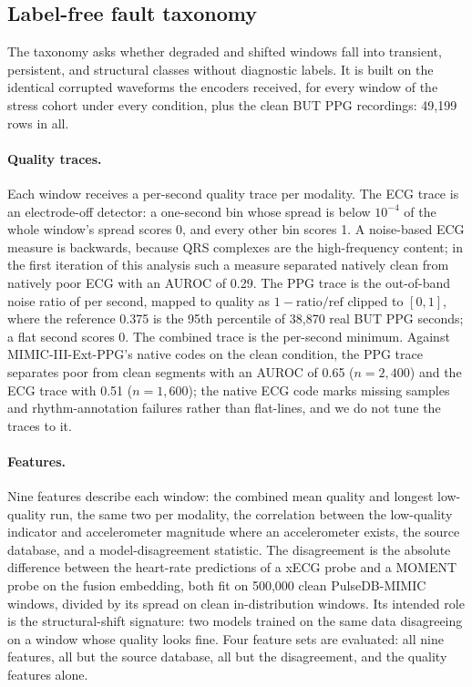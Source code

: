 \documentclass[pmlr,twocolumn,10pt]{jmlr}
\newcommand{\domainmodel}{xECG}
\newcommand{\tsmodel}{MOMENT}
\begin{document}
\subsection{Label-free fault taxonomy}
\label{sec:taxonomy}

The taxonomy asks whether degraded and shifted windows fall into transient, persistent, and structural classes without diagnostic labels. It is built on the identical corrupted waveforms the encoders received, for every window of the stress cohort under every condition, plus the clean BUT PPG recordings: 49,199 rows in all.

\paragraph{Quality traces.}
Each window receives a per-second quality trace per modality. The ECG trace is an electrode-off detector: a one-second bin whose spread is below $10^{-4}$ of the whole window's spread scores 0, and every other bin scores 1. A noise-based ECG measure is backwards, because QRS complexes are the high-frequency content; in the first iteration of this analysis such a measure separated natively clean from natively poor ECG with an AUROC of 0.29. The PPG trace is the out-of-band noise ratio of  per second, mapped to quality as $1-\text{ratio}/\text{ref}$ clipped to $[0,1]$, where the reference 0.375 is the 95th percentile of 38,870 real BUT PPG seconds; a flat second scores 0. The combined trace is the per-second minimum. Against MIMIC-III-Ext-PPG's native codes on the clean condition, the PPG trace separates poor from clean segments with an AUROC of 0.65 ($n=2{,}400$) and the ECG trace with 0.51 ($n=1{,}600$); the native ECG code marks missing samples and rhythm-annotation failures rather than flat-lines, and we do not tune the traces to it.

\paragraph{Features.}
Nine features describe each window: the combined mean quality and longest low-quality run, the same two per modality, the correlation between the low-quality indicator and accelerometer magnitude where an accelerometer exists, the source database, and a model-disagreement statistic. The disagreement is the absolute difference between the heart-rate predictions of a \domainmodel{} probe and a \tsmodel{} probe on the fusion embedding, both fit on 500,000 clean PulseDB-MIMIC windows, divided by its spread on clean in-distribution windows. Its intended role is the structural-shift signature: two models trained on the same data disagreeing on a window whose quality looks fine. Four feature sets are evaluated: all nine features, all but the source database, all but the disagreement, and the quality features alone.
\end{document}
